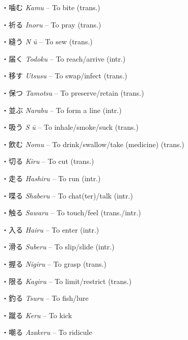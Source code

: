 \par{・噛む \emph{Kamu }– To bite (trans.) }

\par{・祈る \emph{Inoru }– To pray (trans.) }

\par{・縫う \emph{N }\emph{ū }– To sew (trans.) }

\par{・届く \emph{Todoku }– To reach\slash arrive (intr.) }

\par{・移す \emph{Utsusu }– To swap\slash infect (trans.) }

\par{・保つ \emph{Tamotsu }– To preserve\slash retain (trans.) }

\par{・並ぶ \emph{Narabu }– To form a line (intr.) }

\par{・吸う \emph{S }\emph{ū }– To inhale\slash smoke\slash suck (trans.) }

\par{・飲む \emph{Nomu }– To drink\slash swallow\slash take (medicine) (trans.) }

\par{・切る \emph{Kiru }– To cut (trans.) }

\par{・走る \emph{Hashiru }– To run (intr.) }

\par{・喋る \emph{Shaberu }– To chat(ter)\slash talk (intr.) }

\par{・触る \emph{Sawaru }– To touch\slash feel (trans.\slash intr.) }

\par{・入る \emph{Hairu }– To enter (intr.) }

\par{・滑る \emph{Suberu }– To slip\slash slide (intr.) }

\par{・握る \emph{Nigiru }– To grasp (trans.) }

\par{・限る \emph{Kagiru }– To limit\slash restrict (trans.) }

\par{・釣る \emph{Tsuru }– To fish\slash lure }

\par{・蹴る \emph{Keru }– To kick }

\par{・嘲る \emph{Azakeru }– To ridicule }

